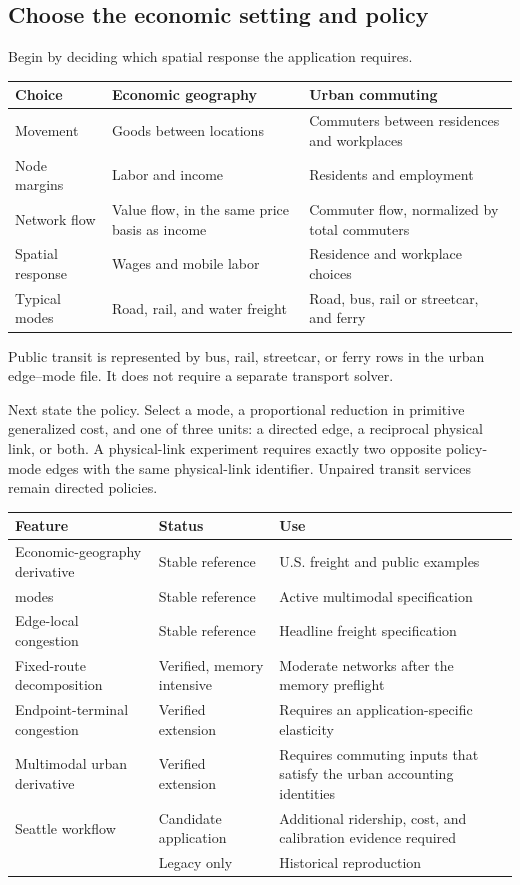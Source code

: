\subsection{Choose the economic setting and policy}

Begin by deciding which spatial response the application requires.
\begin{longtable}{L{0.22\textwidth}L{0.34\textwidth}L{0.34\textwidth}}
\toprule
Choice & Economic geography & Urban commuting \\
\midrule
\endhead
Movement & Goods between locations & Commuters between residences and
workplaces \\
Node margins & Labor and income & Residents and employment \\
Network flow & Value flow, in the same price basis as income & Commuter flow,
normalized by total commuters \\
Spatial response & Wages and mobile labor & Residence and workplace choices \\
Typical modes & Road, rail, and water freight & Road, bus, rail or streetcar,
and ferry \\
\bottomrule
\end{longtable}

Public transit is represented by bus, rail, streetcar, or ferry rows in the
urban edge--mode file. It does not require a separate transport solver.

Next state the policy. Select a mode, a proportional reduction in primitive
generalized cost, and one of three units: a directed edge, a reciprocal
physical link, or both. A physical-link experiment requires exactly two
opposite policy-mode edges with the same physical-link identifier. Unpaired
transit services remain directed policies.

\begin{center}
\small
\begin{tabularx}{\textwidth}{L{0.28\textwidth}L{0.23\textwidth}X}
\toprule
Feature & Status & Use \\
\midrule
Economic-geography derivative & Stable reference & U.S. freight and public
examples \\
 modes & Stable reference & Active multimodal
specification \\
Edge-local congestion & Stable reference & Headline freight specification \\
Fixed-route decomposition & Verified, memory intensive & Moderate networks
after the memory preflight \\
Endpoint-terminal congestion & Verified extension & Requires an
application-specific elasticity \\
Multimodal urban derivative & Verified extension & Requires commuting inputs
that satisfy the urban accounting identities \\
Seattle workflow & Candidate application & Additional ridership, cost, and
calibration evidence required \\
 & Legacy only & Historical reproduction \\
\bottomrule
\end{tabularx}
\end{center}

